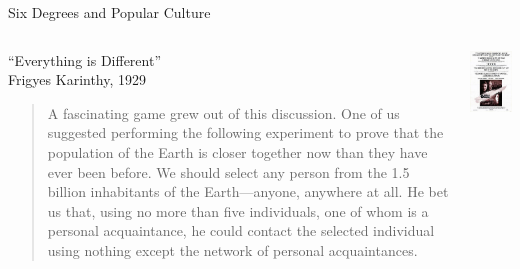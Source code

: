 \begin{frame}{Six Degrees and Popular Culture}

\begin{columns}
\begin{column}{0.65\textwidth}
\begin{block}{“Everything is Different”\\ Frigyes Karinthy, 1929}
\begin{quote}
{\footnotesize
A fascinating game grew out of this discussion. One of us suggested performing
the following experiment to prove that the population of the Earth is closer
together now than they have ever been before. We should select any person from
the 1.5 billion inhabitants of the Earth—anyone, anywhere at all. He bet us
that, using no more than five individuals, one of whom is a personal
acquaintance, he could contact the selected individual using nothing except
the network of personal acquaintances.}
\end{quote}
\end{block}
\end{column}
\begin{column}{0.35\textwidth}
	\includegraphics[width=\textwidth]{figs/08/sixdegrees}
\end{column}
\end{columns}



\end{frame}
